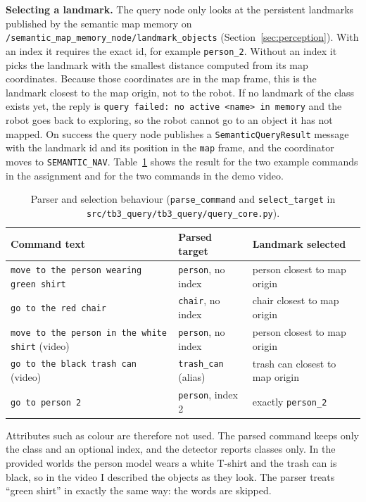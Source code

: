 \documentclass[11pt]{article}
\begin{document}
\textbf{Selecting a landmark.} The query node only looks at the persistent landmarks published by the semantic map memory on \texttt{/semantic\_map\_memory\_node/landmark\_objects} (Section~\ref{sec:perception}). With an index it requires the exact id, for example \texttt{person\_2}. Without an index it picks the landmark with the smallest distance computed from its map coordinates. Because those coordinates are in the map frame, this is the landmark closest to the map origin, not to the robot. If no landmark of the class exists yet, the reply is \texttt{query failed: no active <name> in memory} and the robot goes back to exploring, so the robot cannot go to an object it has not mapped. On success the query node publishes a \texttt{SemanticQueryResult} message with the landmark id and its position in the \texttt{map} frame, and the coordinator moves to \texttt{SEMANTIC\_NAV}. Table~\ref{tab:parse} shows the result for the two example commands in the assignment and for the two commands in the demo video.

\begin{table}[H]
\centering
\footnotesize
\begin{tabular}{lll}
\toprule
Command text & Parsed target & Landmark selected \\
\midrule
\texttt{move to the person wearing green shirt} & \texttt{person}, no index & person closest to map origin \\
\texttt{go to the red chair} & \texttt{chair}, no index & chair closest to map origin \\
\texttt{move to the person in the white shirt} (video) & \texttt{person}, no index & person closest to map origin \\
\texttt{go to the black trash can} (video) & \texttt{trash\_can} (alias) & trash can closest to map origin \\
\texttt{go to person 2} & \texttt{person}, index 2 & exactly \texttt{person\_2} \\
\bottomrule
\end{tabular}
\caption{Parser and selection behaviour (\texttt{parse\_command} and \texttt{select\_target} in \texttt{src/tb3\_query/tb3\_query/query\_core.py}).}
\label{tab:parse}
\end{table}

Attributes such as colour are therefore not used. The parsed command keeps only the class and an optional index, and the detector reports classes only. In the provided worlds the person model wears a white T-shirt and the trash can is black, so in the video I described the objects as they look. The parser treats ``green shirt'' in exactly the same way: the words are skipped.
\end{document}
